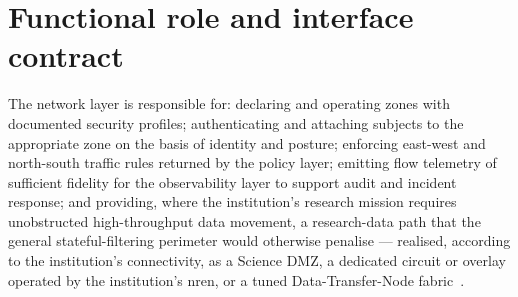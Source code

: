 \section{Functional role and interface contract}
\label{sec:nw-contract}

The network layer is responsible for: declaring and operating
zones with documented security profiles; authenticating and
attaching subjects to the appropriate zone on the basis of identity
and posture; enforcing east-west and north-south traffic rules
returned by the policy layer; emitting flow telemetry of sufficient
fidelity for the observability layer to support audit and incident
response; and providing, where the institution's research mission
requires unobstructed high-throughput data movement, a research-data
path that the general stateful-filtering perimeter would otherwise
penalise --- realised, according to the institution's connectivity, as
a Science DMZ, a dedicated circuit or overlay operated by the
institution's \gls{nren}, or
a tuned Data-Transfer-Node fabric~\cite{geant-dtn}.

